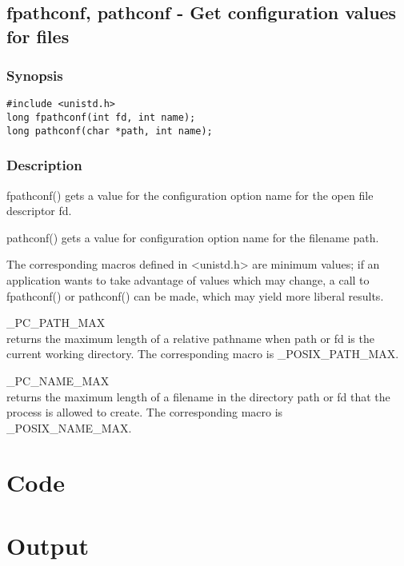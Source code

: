 \subsection{fpathconf, pathconf - Get configuration values for files}

\subsubsection{Synopsis}

\begin{lstlisting}
#include <unistd.h>
long fpathconf(int fd, int name);
long pathconf(char *path, int name);
\end{lstlisting}

\subsubsection{Description}

fpathconf() gets a value for the configuration option name for the open file descriptor fd.

pathconf() gets a value for configuration option name for the filename path.

The corresponding macros defined in <unistd.h> are minimum values; if an application wants to take advantage of values which may change, a call to fpathconf() or pathconf() can be made, which may yield more liberal results.

\begin{description}
	\item \_PC\_PATH\_MAX \hfill \\
		returns the maximum length of a relative pathname when path or fd is the current working directory.  The  corresponding macro is \_POSIX\_PATH\_MAX.  
	\item \_PC\_NAME\_MAX \hfill \\
		returns the maximum length of a filename in the directory path or fd that the process is allowed to create.  The corresponding macro is \_POSIX\_NAME\_MAX.
\end{description}

\section{Code}



\section{Output}


